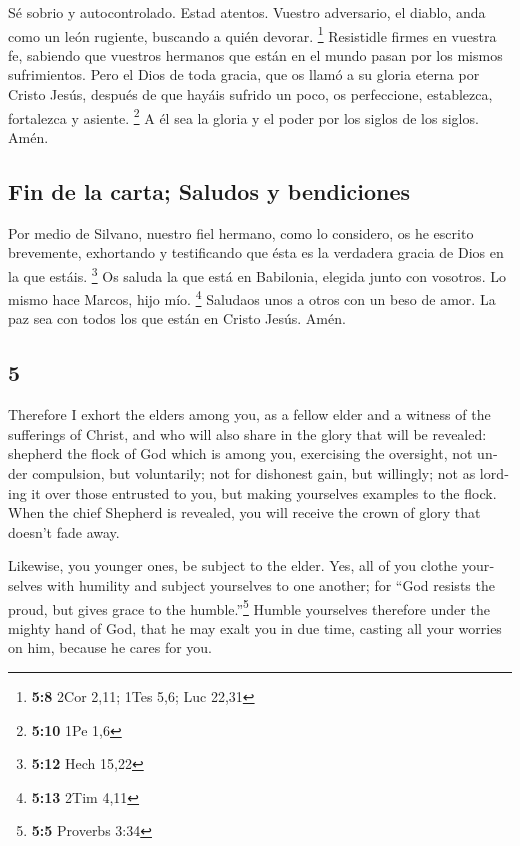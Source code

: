 \begin{paracol}{2}
 Sé sobrio y autocontrolado. Estad atentos. Vuestro
adversario, el diablo, anda como un león rugiente, buscando a quién
devorar. \footnote{\textbf{5:8} 2Cor 2,11; 1Tes 5,6; Luc 22,31}
 Resistidle firmes en vuestra fe, sabiendo que vuestros
hermanos que están en el mundo pasan por los mismos sufrimientos.
 Pero el Dios de toda gracia, que os llamó a su gloria
eterna por Cristo Jesús, después de que hayáis sufrido un poco, os
perfeccione, establezca, fortalezca y asiente. \footnote{\textbf{5:10}
  1Pe 1,6}  A él sea la gloria y el poder por los siglos
de los siglos. Amén.

\hypertarget{fin-de-la-carta-saludos-y-bendiciones}{%
\subsection{Fin de la carta; Saludos y
bendiciones}\label{fin-de-la-carta-saludos-y-bendiciones}}

 Por medio de Silvano, nuestro fiel hermano, como lo
considero, os he escrito brevemente, exhortando y testificando que ésta
es la verdadera gracia de Dios en la que estáis. \footnote{\textbf{5:12}
  Hech 15,22}  Os saluda la que está en Babilonia,
elegida junto con vosotros. Lo mismo hace Marcos, hijo mío. \footnote{\textbf{5:13}
  2Tim 4,11}  Saludaos unos a otros con un beso de amor.
La paz sea con todos los que están en Cristo Jesús. Amén. \switchcolumn
\begin{otherlanguage}{english}

\hypertarget{section-9}{%
\section{5}\label{section-9}}

 Therefore I exhort the elders among you, as a fellow
elder and a witness of the sufferings of Christ, and who will also share
in the glory that will be revealed:  shepherd the flock of
God which is among you, exercising the oversight, not under compulsion,
but voluntarily; not for dishonest gain, but willingly; 
not as lording it over those entrusted to you, but making yourselves
examples to the flock.  When the chief Shepherd is
revealed, you will receive the crown of glory that doesn't fade away.

 Likewise, you younger ones, be subject to the elder. Yes,
all of you clothe yourselves with humility and subject yourselves to one
another; for ``God resists the proud, but gives grace to the
humble.''\footnote{\textbf{5:5} Proverbs 3:34}  Humble
yourselves therefore under the mighty hand of God, that he may exalt you
in due time,  casting all your worries on him, because he
cares for you.


\end{otherlanguage}
\end{paracol}

